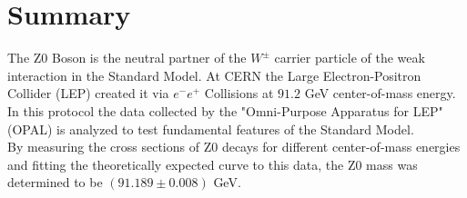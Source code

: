 \section{Summary}
	The Z0 Boson is the neutral partner of the $W^{\pm}$ carrier particle of the weak interaction in the Standard Model. At CERN the Large Electron-Positron Collider (LEP) created it via $e^{-}e^{+}$ Collisions at $91.2$ GeV center-of-mass energy. In this protocol the data collected by the "Omni-Purpose Apparatus for LEP" (OPAL) is analyzed to test fundamental features of the Standard Model.\\
	By measuring the cross sections of Z0 decays for different center-of-mass energies and fitting the theoretically expected curve to this data, the Z0 mass was determined to be $(91.189\pm0.008)$ GeV.